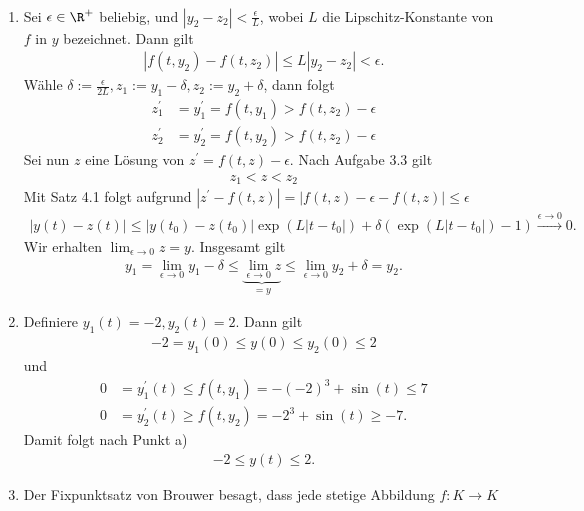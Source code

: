 \begin{solution}
\leavevmode \\
\begin{enumerate}[label = \textbf{\alph*)}]
  \item Sei $\epsilon \in \R^+$ beliebig,
  und $|y_2 - z_2| < \frac{\epsilon}{L}$, wobei
  $L$ die Lipschitz-Konstante von $f$ in $y$ bezeichnet.
  Dann gilt
  \begin{align*}
    |f(t,y_2) - f(t,z_2)| \leq L |y_2 - z_2| < \epsilon.
  \end{align*}
  Wähle $\delta := \frac{\epsilon}{2L}, z_1 := y_1 - \delta, z_2 := y_2 + \delta$, dann folgt
  \begin{align*}
    z_1^{\prime} &= y_1^{\prime} = f(t,y_1) > f(t,z_2) - \epsilon \\
    z_2^{\prime} &= y_2^{\prime} = f(t,y_2) > f(t,z_2) - \epsilon
  \end{align*}
  Sei nun $z$ eine Lösung von $z^{\prime} = f(t,z) - \epsilon$.
  Nach Aufgabe 3.3 gilt
  \begin{align*}
    z_1 < z < z_2
  \end{align*}
  Mit Satz 4.1 folgt aufgrund $|z^{\prime} - f(t,z)| = |f(t,z) - \epsilon - f(t,z)| \leq \epsilon$
  \begin{align*}
  |y(t) - z(t)| \leq |y(t_0) - z(t_0)|\exp(L|t - t_0|) + \delta\left(\exp(L|t-t_0|) - 1\right)
  \stackrel{\epsilon \to 0}{\longrightarrow} 0.
  \end{align*}
  Wir erhalten $\lim_{\epsilon \to 0} z = y$. Insgesamt gilt
  \begin{align*}
    y_1 = \lim_{\epsilon \to 0}y_1 - \delta \leq \underbrace{\lim_{\epsilon \to 0} z}_{= y} \leq
    \lim_{\epsilon \to 0}y_2 + \delta = y_2.
  \end{align*}
  \item Definiere $y_1(t) = -2, y_2(t) = 2$. Dann gilt
  \begin{align*}
    -2 = y_1(0) \leq y(0) \leq y_2(0) \leq 2
  \end{align*}
  und
  \begin{align*}
    0 &= y_1^{\prime}(t) \leq f(t,y_1) = -(-2)^3 + \sin(t) \leq 7 \\
    0 &= y_2^{\prime}(t) \geq f(t,y_2) = -2^3 + \sin(t) \geq -7.
  \end{align*}
  Damit folgt nach Punkt a)
  \begin{align*}
    -2 \leq y(t) \leq 2.
  \end{align*}
  \item Der Fixpunktsatz von Brouwer besagt, dass jede stetige Abbildung $f: K \to K$

\end{enumerate}
\end{solution}
